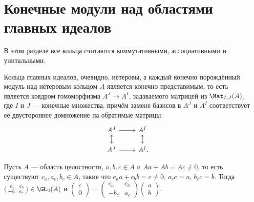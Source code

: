 \documentclass[
	extrafontsizes,
	11pt,
	hyphens,
]{memoir}
\begin{document}
\section{Конечные модули над областями главных идеалов}

\begin{convention}
В этом разделе все кольца считаются коммутативными, ассоциативными и унитальными.
\end{convention}

\begin{observation}
\label{obs:modpid}
Кольца главных идеалов, очевидно, нётеровы,
а каждый конечно порождённый модуль над нётеровым кольцом \(A\) является конечно представимым, то есть является коядром гомоморфизма
\(A^J \to A^I\), задаваемого матрицей из \(\Mat_{I,J}(A)\), где \(I\) и \(J\) --- конечные множества, причём замене базисов в
\(A^J\) и \(A^I\) соответствует её двустороннее домножение на обратимые матрицы:
\begin{equation*}
\begin{tikzcd}[row sep = scriptsize]
    A^J \arrow{r} \arrow[leftrightarrow]{d} & A^I \arrow[leftrightarrow]{d} \\
    A^J \arrow{r} & A^I\mathrlap{.}
\end{tikzcd}
\label{eq:Am_to_An}
\end{equation*}
\end{observation}


\begin{lemma}
Пусть \(A\) --- область целостности, \(a,b,c \in A\) и \(Aa + Ab = Ac \neq 0\), то есть существуют \(c_a,a_c,b_c \in A\), такие что \(c_a a + c_b b = c \neq 0\), \(a_c c = a\), \(b_c c = b\).
\label{lem:PIDmatrix2}
Тогда
\(
(
\begin{smallmatrix}
    c_a & c_b \\
    -b_c & a_c
\end{smallmatrix}
)
\in
\GL_2(A)
\)
и
\(
(
\begin{smallmatrix}
    c \\
    0 
\end{smallmatrix}
)
=
(
\begin{smallmatrix}
    c_a & c_b \\
    -b_c & a_c
\end{smallmatrix}
)
(
\begin{smallmatrix}
    a \\
    b 
\end{smallmatrix}
)
\).
\end{lemma}
\end{document}
